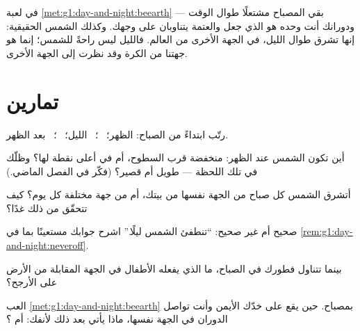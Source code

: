 \begin{remark}\label{rem:g1:day-and-night:neveroff}
في لعبة \cref{met:g1:day-and-night:beearth} بقي المصباح مشتعلًا
طوال الوقت --- ودورانك أنت وحده هو الذي جعل  والعتمة يتناوبان
على وجهك. وكذلك الشمس الحقيقية: إنها تشرق طوال الليل، في الجهة
الأخرى من العالم. فالليل ليس راحةً للشمس؛ إنما هو جهتنا من الكرة
وقد نظرت إلى الجهة الأخرى.
\end{remark}

\section{تمارين}

\begin{exercise}[$\star$]\label{exo:g1:day-and-night:1}
رتّب ابتداءً من الصباح: الظهر؛ \ ؛ \ الليل؛
\ ؛ \ بعد الظهر.
\end{exercise}

\begin{exercise}[$\star$]\label{exo:g1:day-and-night:2}
أين تكون الشمس عند الظهر: منخفضة قرب السطوح، أم في أعلى نقطة لها؟
وظلّك في تلك اللحظة --- طويل أم قصير؟ (فكّر في الفصل الماضي.)
\end{exercise}

\begin{exercise}[$\star$]\label{exo:g1:day-and-night:3}
أتشرق الشمس كل صباح من الجهة نفسها من بيتك، أم من جهة مختلفة كل
يوم؟ كيف تتحقّق من ذلك غدًا؟
\end{exercise}

\begin{exercise}[$\star$]\label{exo:g1:day-and-night:4}
صحيح أم غير صحيح: ``تنطفئ الشمس ليلًا.'' اشرح جوابك مستعينًا
بما في \cref{rem:g1:day-and-night:neveroff}.
\end{exercise}

\begin{exercise}[$\star$]\label{exo:g1:day-and-night:5}
بينما تتناول فطورك في  الصباح، ما الذي يفعله الأطفال في الجهة
المقابلة من الأرض على الأرجح؟
\end{exercise}

\begin{exercise}[$\star$]\label{exo:g1:day-and-night:6}
العب \cref{met:g1:day-and-night:beearth} بمصباح. حين يقع 
على خدّك الأيمن وأنت تواصل الدوران في الجهة نفسها، ماذا يأتي بعد
ذلك لأنفك:  أم ؟
\end{exercise}

